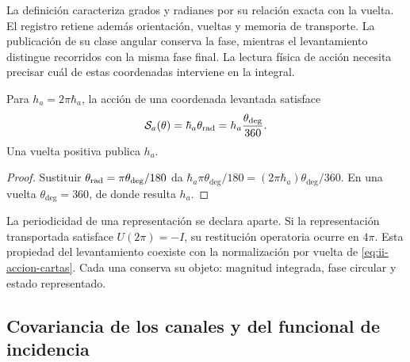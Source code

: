 La definición caracteriza grados y radianes por su relación exacta
con la vuelta. El registro retiene además orientación, vueltas y
memoria de transporte. La publicación de su clase angular conserva
la fase, mientras el levantamiento distingue recorridos con la misma
fase final. La lectura física de acción necesita precisar cuál de
estas coordenadas interviene en la integral.

\begin{proposition}
Para \(h_a=2\pi\hbar_a\), la acción de una coordenada levantada
satisface
\begin{equation}
 \mathcal S_a(\theta)
 =\hbar_a\theta_{\rm rad}
 =h_a\frac{\theta_{\deg}}{360}.
 \label{eq:ii-accion-cartas}
\end{equation}
Una vuelta positiva publica \(h_a\).
\end{proposition}
\begin{proof}
Sustituir \(\theta_{\rm rad}=\pi\theta_{\deg}/180\) da
\(\hbar_a\pi\theta_{\deg}/180
=(2\pi\hbar_a)\theta_{\deg}/360\). En una vuelta
\(\theta_{\deg}=360\), de donde resulta \(h_a\).
\end{proof}

La periodicidad de una representación se declara aparte. Si la
representación transportada satisface \(U(2\pi)=-I\), su restitución
operatoria ocurre en \(4\pi\). Esta propiedad del levantamiento
coexiste con la normalización por vuelta de
\eqref{eq:ii-accion-cartas}. Cada una conserva su objeto: magnitud
integrada, fase circular y estado representado.

\subsection{Covariancia de los canales y del funcional de incidencia}

